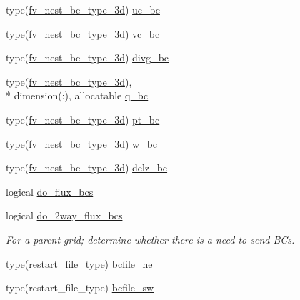 \begin{DoxyCompactItemize}
\item 
type(\hyperlink{structfv__arrays__mod_1_1fv__nest__bc__type__3d}{fv\-\_\-nest\-\_\-bc\-\_\-type\-\_\-3d}) \hyperlink{structfv__arrays__mod_1_1fv__nest__type_a788322ff21e9cd4ae87c5d5dc0fbb559}{uc\-\_\-bc}
\item 
type(\hyperlink{structfv__arrays__mod_1_1fv__nest__bc__type__3d}{fv\-\_\-nest\-\_\-bc\-\_\-type\-\_\-3d}) \hyperlink{structfv__arrays__mod_1_1fv__nest__type_a1ba2092e661ff1c06374c9e9ed7b9164}{vc\-\_\-bc}
\item 
type(\hyperlink{structfv__arrays__mod_1_1fv__nest__bc__type__3d}{fv\-\_\-nest\-\_\-bc\-\_\-type\-\_\-3d}) \hyperlink{structfv__arrays__mod_1_1fv__nest__type_a0a4874426e6bee79a4fef6ac4379b0af}{divg\-\_\-bc}
\item 
type(\hyperlink{structfv__arrays__mod_1_1fv__nest__bc__type__3d}{fv\-\_\-nest\-\_\-bc\-\_\-type\-\_\-3d}), \\*
dimension(\-:), allocatable \hyperlink{structfv__arrays__mod_1_1fv__nest__type_a79129035b599fe5d20157b044275ce39}{q\-\_\-bc}
\item 
type(\hyperlink{structfv__arrays__mod_1_1fv__nest__bc__type__3d}{fv\-\_\-nest\-\_\-bc\-\_\-type\-\_\-3d}) \hyperlink{structfv__arrays__mod_1_1fv__nest__type_a94b7a20dbb7ee4b45a205c3ca3dd2e8c}{pt\-\_\-bc}
\item 
type(\hyperlink{structfv__arrays__mod_1_1fv__nest__bc__type__3d}{fv\-\_\-nest\-\_\-bc\-\_\-type\-\_\-3d}) \hyperlink{structfv__arrays__mod_1_1fv__nest__type_a91ca658afc2467a244897e03517ddf75}{w\-\_\-bc}
\item 
type(\hyperlink{structfv__arrays__mod_1_1fv__nest__bc__type__3d}{fv\-\_\-nest\-\_\-bc\-\_\-type\-\_\-3d}) \hyperlink{structfv__arrays__mod_1_1fv__nest__type_af43f7736d23f17652015e657caa632d9}{delz\-\_\-bc}
\item 
logical \hyperlink{structfv__arrays__mod_1_1fv__nest__type_afe693f9e78d785ff459e258974dd4947}{do\-\_\-flux\-\_\-bcs}
\item 
logical \hyperlink{structfv__arrays__mod_1_1fv__nest__type_a4e16a967cedaa9fc77a2380849fc5345}{do\-\_\-2way\-\_\-flux\-\_\-bcs}
\begin{DoxyCompactList}\small\item\em For a parent grid; determine whether there is a need to send B\-Cs. \end{DoxyCompactList}\item 
type(restart\-\_\-file\-\_\-type) \hyperlink{structfv__arrays__mod_1_1fv__nest__type_a6c3a42fa4470f85cb7122203f20c91b1}{bcfile\-\_\-ne}
\item 
type(restart\-\_\-file\-\_\-type) \hyperlink{structfv__arrays__mod_1_1fv__nest__type_ae213d6b31c417bf50951cbfdd69f1713}{bcfile\-\_\-sw}
\end{DoxyCompactItemize}


